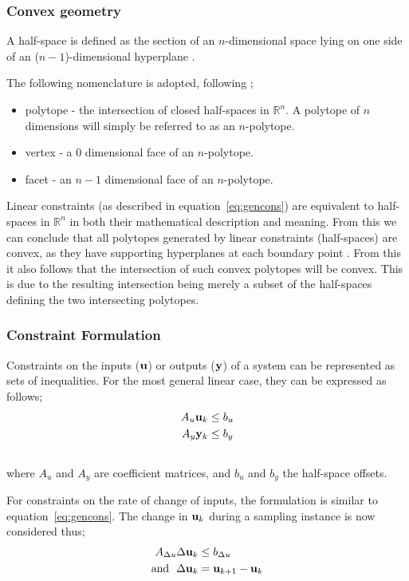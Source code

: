 \documentclass[final,authoryear,5pt,times,twocolumn]{elsarticle}
\newcommand{\vect}[1] %
{{\bf {#1}}}
\newcommand{\npoly}{$n$-polytope}
\begin{document}
\subsubsection{Convex geometry}
A half-space is defined as the section of an $n$-dimensional space lying on one side of an ($n-1$)-dimensional hyperplane \citep[1282]{crcmaths}.

The following nomenclature is adopted, following \citet[487]{bayerlee};
\begin{itemize}
\item polytope - the intersection of closed half-spaces in $\mathbb{R}^n$.
A polytope of $n$ dimensions will simply be referred to as an $n$-polytope.
\item vertex - a 0 dimensional face of an \npoly.
\item facet - an $n-1$ dimensional face of an \npoly.
\end{itemize}

Linear constraints (as described in equation~\ref{eq:gencons}) are equivalent to half-spaces in $\mathbb{R}^n$ in both their mathematical description and meaning.
From this we can conclude that all polytopes generated by linear constraints (half-spaces) are convex, as they have supporting hyperplanes at each boundary point \citep[21]{manilev}.
From this it also follows that the intersection of such convex polytopes will be convex.
This is due to the resulting intersection being merely a subset of the half-spaces defining the two intersecting polytopes.

\subsubsection{Constraint Formulation}
Constraints on the inputs ($\vect{u}$) or outputs ($\vect{y}$) of a system can be represented as sets of inequalities.
For the most general linear case, they can be expressed as follows;
\begin{align}
  \label{eq:gencons}
  A_u\vect{u}_k &\leq b_u \\ \notag
  A_y\vect{y}_k &\leq b_y \\ \notag
\end{align}
where $A_u$ and $A_y$ are coefficient matrices, and $b_u$ and $b_y$  the half-space offsets.

For constraints on the rate of change of inputs, the formulation is similar to equation~\ref{eq:gencons}.
The change in $\vect{u}_k$ during a sampling instance is now considered thus;
\begin{align*}
  A_{\Delta u}\Delta \vect{u}_k &\leq b_{\Delta u} \notag \\
  \text{and}~~ \Delta \vect{u}_k &= \vect{u}_{k+1}-\vect{u}_k
\end{align*}
\end{document}
